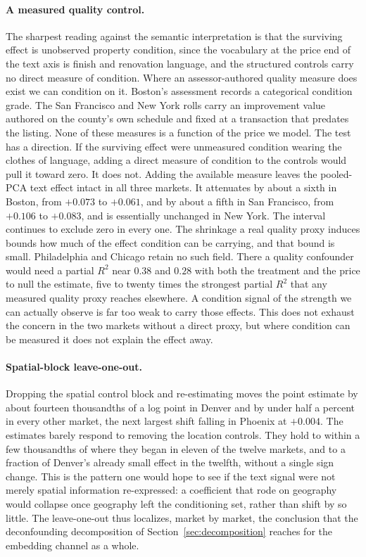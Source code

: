 \paragraph{A measured quality control.} The sharpest reading against the semantic
interpretation is that the surviving effect is unobserved property condition, since
the vocabulary at the price end of the text axis is finish and renovation language,
and the structured controls carry no direct measure of condition. Where an
assessor-authored quality measure does exist we can condition on it. Boston's assessment records a categorical condition grade. The San Francisco and New York rolls carry an improvement value authored on the county's own schedule and fixed at a transaction that predates the listing. None of these measures is a function of the price we model.
The test has a direction. If the surviving effect were unmeasured condition wearing the
clothes of language, adding a direct measure of condition to the controls would pull it
toward zero. It does not. Adding the available measure leaves the pooled-PCA text effect intact in all three markets. It attenuates by about a sixth in Boston, from $+0.073$ to $+0.061$, and by about a fifth in San Francisco, from $+0.106$ to $+0.083$, and is essentially unchanged in New York. The interval continues to exclude zero in every one. The shrinkage a real quality proxy induces bounds how much of the effect
condition can be carrying, and that bound is small. Philadelphia and Chicago retain no such field. There a quality confounder would need a partial $R^2$ near $0.38$ and $0.28$ with both the treatment and the price to null the estimate, five to twenty times the strongest partial $R^2$ that any measured quality proxy reaches elsewhere. A condition signal of the strength we can actually observe is far too weak to carry those effects. This does
not exhaust the concern in the two markets without a direct proxy, but where
condition can be measured it does not explain the effect away.

\paragraph{Spatial-block leave-one-out.} Dropping the spatial control block and
re-estimating moves the point estimate by about fourteen thousandths of a log point
in Denver and by under half a percent in every other market, the next largest shift
falling in Phoenix at $+0.004$. The estimates barely respond to removing the
location controls. They hold to within a few thousandths of where they began in eleven
of the twelve markets, and to a fraction of Denver's already small effect in the
twelfth, without a single sign change. This is the pattern one would hope to see if the
text signal were not merely spatial information re-expressed: a coefficient that
rode on geography would collapse once geography left the conditioning set, rather than
shift by so little. The leave-one-out thus localizes, market by market, the conclusion
that the deconfounding decomposition of Section~\ref{sec:decomposition} reaches for
the embedding channel as a whole.

